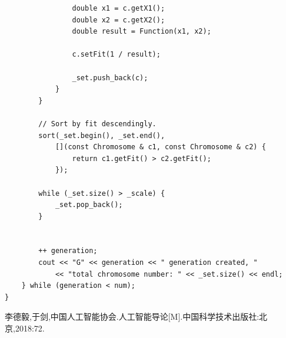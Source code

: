 \documentclass[UTF8]{ctexart}
\begin{document}
\begin{lstlisting}
                double x1 = c.getX1();
                double x2 = c.getX2();
                double result = Function(x1, x2);

                c.setFit(1 / result);

                _set.push_back(c);
            }
        }

        // Sort by fit descendingly.
        sort(_set.begin(), _set.end(),
            [](const Chromosome & c1, const Chromosome & c2) {
                return c1.getFit() > c2.getFit();
            });

        while (_set.size() > _scale) {
            _set.pop_back();
        }


        ++ generation;
        cout << "G" << generation << " generation created, "
            << "total chromosome number: " << _set.size() << endl;
    } while (generation < num);
}
\end{lstlisting}

\begin{thebibliography}{99}
    李德毅,于剑,中国人工智能协会.人工智能导论[M].中国科学技术出版社:北京,2018:72.
\end{thebibliography}
\end{document}
